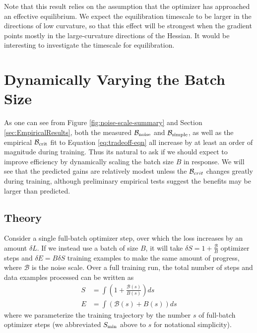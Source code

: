 \documentclass[english]{article}
\newcommand{\CB}{{\cal B}}
\begin{document}
Note that this result relies on the assumption that the optimizer has approached an effective equilibrium. We expect the equilibration timescale to be larger in the directions of low curvature, so that this effect will be strongest when the gradient points mostly in the large-curvature directions of the Hessian.  It would be interesting to investigate the timescale for equilibration.



\section{Dynamically Varying the Batch Size}

\label{app:DynamicBS}

As one can see from Figure \ref{fig:noise-scale-summary} and Section \ref{sec:EmpiricalResults}, both the measured $\mathcal{B}_{{\rm noise}}$ and $\mathcal{B}_{{\rm simple}}$, as well as the empirical $\mathcal{B}_{{\rm crit}}$ fit to Equation \ref{eq:tradeoff-eqn} all increase by at least an order of magnitude during training. Thus its natural to ask if we should expect to improve efficiency by dynamically scaling the batch size $B$ in response. We will see that the predicted gains are relatively modest unless the $\CB_{crit}$ changes greatly during training, although preliminary empirical tests suggest the benefits may be larger than predicted.

\subsection{Theory}

Consider a single full-batch optimizer step, over which the loss increases by an amount $\delta L$. If we instead use a batch of size $B$, it will take $\delta S=1+\frac{\mathcal{B}}{B}$ optimizer steps and $\delta E=B\delta S$ training examples to make the same amount of progress, where $\mathcal{B}$ is the noise scale.
Over a full training run, the total number of steps and data examples processed can be written as
\begin{align}
S & =\int\left(1+\frac{\mathcal{B}(s)}{B(s)}\right)ds\label{eq:total-steps-and-examples-apdx}\\
E & =\int\left(\mathcal{B}(s)+B(s)\right)ds\nonumber
\end{align}
where we parameterize the training trajectory by the number $s$ of full-batch optimizer steps (we abbreviated $S_{{\rm min}}$ above to $s$ for notational simplicity).
\end{document}
